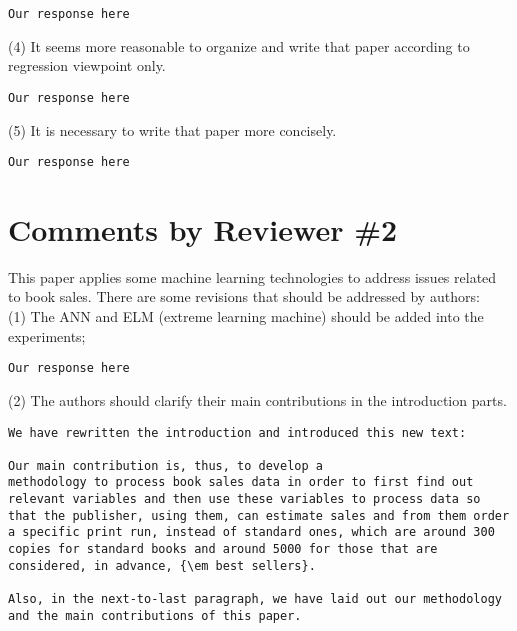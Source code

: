 \documentclass[preprint]{elsarticle}
\begin{document}
\begin{verbatim}
Our response here
\end{verbatim}

\noindent (4) It seems more reasonable to organize and write that paper according to regression viewpoint only.\\

\begin{verbatim}
Our response here
\end{verbatim}

\noindent (5) It is necessary to write that paper more concisely.\\

\begin{verbatim}
Our response here
\end{verbatim}





\section{Comments by Reviewer \#2}

\noindent This paper applies some machine learning technologies to address issues related to book sales. There are some revisions that should be addressed by authors:\\


\noindent (1) The ANN and ELM (extreme learning machine) should be added into the experiments;\\

\begin{verbatim}
Our response here
\end{verbatim}


\noindent (2) The authors should clarify their main contributions in the introduction parts.\\

\begin{verbatim}
We have rewritten the introduction and introduced this new text:

Our main contribution is, thus, to develop a
methodology to process book sales data in order to first find out
relevant variables and then use these variables to process data so
that the publisher, using them, can estimate sales and from them order
a specific print run, instead of standard ones, which are around 300
copies for standard books and around 5000 for those that are
considered, in advance, {\em best sellers}.

Also, in the next-to-last paragraph, we have laid out our methodology 
and the main contributions of this paper.

\end{verbatim}
\end{document}
